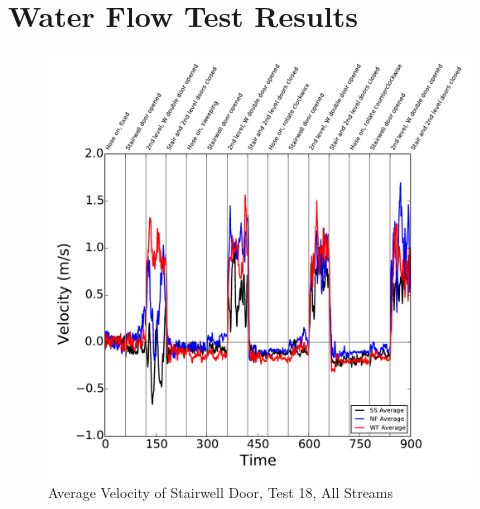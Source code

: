 \documentclass[12pt,oneside]{book}
\begin{document}
\section{Water Flow Test Results}
\label{sec:Water_Flow_Test_Results}

\begin{figure}[!ht]
\includegraphics[width=6in]{../../Figures/Hose_Test_Figures/Test_18_West_063014_BDP_A10_Avg}
\caption{Average Velocity of Stairwell Door, Test 18, All Streams}
\label{fig:Test_18_BDP_A10_Avg_All}
\end{figure}
\end{document}
